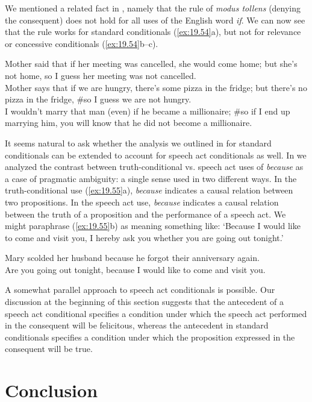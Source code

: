 We mentioned a related fact in , namely that the rule of \textit{modus tollens} (denying the consequent) does not hold for all uses of the English word \textit{if}. We can now see that the rule works for standard conditionals (\ref{ex:19.54}a), but not for relevance or concessive conditionals (\ref{ex:19.54}b--c).


\ea \label{ex:19.54}
\ea  Mother said that if her meeting was cancelled, she would come home; but she’s not home, so I guess her meeting was not cancelled.\\
\ex Mother says that if we are hungry, there’s some pizza in the fridge; but there’s no pizza in the fridge, \#so I guess we are not hungry.\\
\ex I wouldn’t marry that man (even) if he became a millionaire; \#so if I end up marrying him, you will know that he did not become a millionaire.
                       \z
\z


It seems natural to ask whether the analysis we outlined in  for standard conditionals can be extended to account for speech act conditionals as well. In  we analyzed the contrast between truth-conditional vs. speech act uses of \textit{because} as a case of pragmatic ambiguity: a single sense used in two different ways. In the truth-conditional use (\ref{ex:19.55}a), \textit{because} indicates a causal relation between two propositions. In the speech act use, \textit{because} indicates a causal relation between the truth of a proposition and the performance of a speech act. We might paraphrase (\ref{ex:19.55}b) as meaning something like: ‘Because I would like to come and visit you, I hereby ask you whether you are going out tonight.’


\ea \label{ex:19.55}
\ea  Mary scolded her husband because he forgot their anniversary again.\\
\ex Are you going out tonight, because I would like to come and visit you.
                       \z
\z


A somewhat parallel approach to speech act conditionals is possible. Our discussion at the beginning of this section suggests that the antecedent of a speech act conditional specifies a condition under which the speech act performed in the consequent will be felicitous, whereas the antecedent in standard conditionals specifies a condition under which the proposition expressed in the consequent will be true.


\section{Conclusion}\label{sec:19.8}

